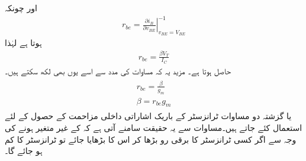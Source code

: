 اور چونکہ
\begin{align*}
r_{be}=\left. \frac{\partial i_B}{\partial v_{BE}} \right |_{v_{BE}=V_{BE}}^{-1}
\end{align*}
ہوتا ہے لہٰذا
\begin{align} \label{مساوات_ٹرانزسٹر_داخلی_مزاحمت_بالمقابل_رو}
r_{be}=\frac{\beta V_T}{I_C}
\end{align}
حاصل ہوتا ہے۔ مزید یہ کہ مساوات   کی مدد سے اسے یوں بھی لکھ سکتے ہیں۔
\begin{gather} \label{مساوات_ٹرانزسٹر_داخلی_مزاحمت_بالمقابل_موصلیت_نما}
\begin{aligned} 
r_{be}=\frac{\beta}{g_m} \\
\beta=r_{be} g_m
\end{aligned}
\end{gather}
یا
گزشتہ دو مساوات ٹرانزسٹر کے باریک اشاراتی داخلی مزاحمت  کے حصول کے لئے استعمال کئے جاتے ہیں۔مساوات   سے یہ حقیقت سامنے آتی ہے  کہ    کے غیر متغیر ہونے کی وجہ سے اگر کسی ٹرانزسٹر کا برقی رو   بڑھا کر اس کا  بڑھایا جائے تو ٹرانزسٹر کا  کم ہو جائے گا۔

